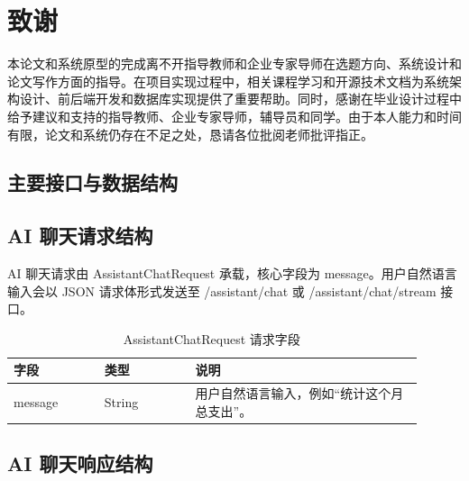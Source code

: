 \documentclass[bachelor, print]{xduthesis}
\begin{document}
\chapter*{致谢}

本论文和系统原型的完成离不开指导教师和企业专家导师在选题方向、系统设计和论文写作方面的指导。在项目实现过程中，相关课程学习和开源技术文档为系统架构设计、前后端开发和数据库实现提供了重要帮助。同时，感谢在毕业设计过程中给予建议和支持的指导教师、企业专家导师，辅导员和同学。由于本人能力和时间有限，论文和系统仍存在不足之处，恳请各位批阅老师批评指正。




\begin{appendix}

\chapter{主要接口与数据结构}

\section{AI 聊天请求结构}

AI 聊天请求由 AssistantChatRequest 承载，核心字段为 message。用户自然语言输入会以 JSON 请求体形式发送至 /assistant/chat 或 /assistant/chat/stream 接口。

\begin{table}[H]
    \centering
    \caption{AssistantChatRequest 请求字段}
    \label{tab:assistant-request}
    \begin{tabular}{|p{0.2\linewidth}|p{0.2\linewidth}|p{0.5\linewidth}|}
        \hline
        字段 & 类型 & 说明 \\
        \hline
        message & String & 用户自然语言输入，例如“统计这个月总支出”。 \\
        \hline
    \end{tabular}
\end{table}

\section{AI 聊天响应结构}


\end{appendix}
\end{document}
